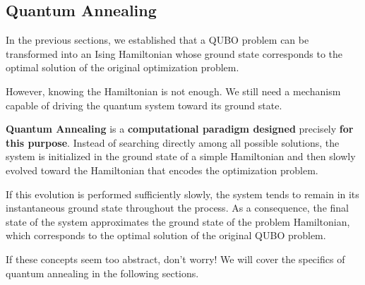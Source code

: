 \subsection{Quantum Annealing}\label{sec:quantum-annealing}

In the previous sections, we established that a QUBO problem can be transformed into an Ising Hamiltonian whose ground state corresponds to the optimal solution of the original optimization problem.

\highspace
However, knowing the Hamiltonian is not enough. We still need a mechanism capable of driving the quantum system toward its ground state.

\highspace
\textbf{Quantum Annealing} is a \textbf{computational paradigm designed} precisely \textbf{for this purpose}. Instead of searching directly among all possible solutions, the system is initialized in the ground state of a simple Hamiltonian and then slowly evolved toward the Hamiltonian that encodes the optimization problem.

\highspace
If this evolution is performed sufficiently slowly, the system tends to remain in its instantaneous ground state throughout the process. As a consequence, the final state of the system approximates the ground state of the problem Hamiltonian, which corresponds to the optimal solution of the original QUBO problem.

\highspace
If these concepts seem too abstract, don't worry! We will cover the specifics of quantum annealing in the following sections.